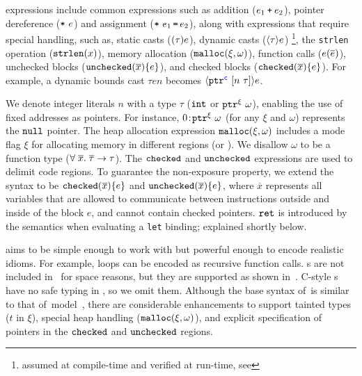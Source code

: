 \lang expressions include common expressions such as addition ($e_1 \mathbin{\texttt{+}} e_2$), 
pointer dereference ($\texttt{*}~{e}$) and assignment ($\texttt{*}~{e_1}\,\texttt{=}\, {e_2}$),
along with expressions that require special handling, such as,
 static casts ($\mathtt{(}{\tau}\mathtt{)}{e}$), dynamic casts ($\langle{\tau}\rangle{e}$) \footnote{assumed at compile-time and verified at run-time, see }, the \texttt{strlen} operation ($\mathtt{strlen}({x})$),
memory allocation ($\mathtt{malloc}({\xi},{\omega})$), 
function calls (${e}({\overline{e}})$),
unchecked blocks ($\mathtt{unchecked}({\overline{x}})\{e\}$), and checked blocks ($\mathtt{checked}({\overline{x}}){\{e\}}$).
For example, a dynamic bounds cast
  {\footnotesize
    $\tau$\code{>>(}$e$$n$\code{))} }
becomes 
{\footnotesize$\langle{\ensuremath{\mathtt{ptr}^{\textcolor{blue}{\texttt{c}}}~{[{n}~{\tau}]}}}\rangle{e}$}. 
% 

% 
We denote integer literals $n$ with a type $\tau$ (\ie $\mathtt{int}$ or $\mathtt{ptr}^{\xi}~{\omega}$), enabling the use of fixed addresses as pointers.
For instance, ${0}\!:\!{\mathtt{ptr}^{\xi}~{\omega}}$ (for any $\xi$ and $\omega$) represents the $\mathtt{null}$ pointer.
The heap allocation expression $\mathtt{malloc}({\xi},{\omega})$ includes a mode flag $\xi$ for allocating memory in different regions (\cregion or \ucregion).
We disallow $\omega$ to be a function type ($\forall \;\overline{x}.\;{\overline{\tau}}\to\tau$).
The $\mathtt{checked}$ and $\mathtt{unchecked}$ expressions are used to delimit code regions.
To guarantee the non-exposure property, we extend the \checkedc syntax to be $\mathtt{checked}({\overline{x}}){\{e\}}$ and $\mathtt{unchecked}({\overline{x}})\{e\}$,
where $\overline{x}$ represents all variables that are allowed to communicate between instructions outside and inside of the block $e$, and cannot contain checked pointers.
$\mathtt{ret}$ is introduced by the semantics when evaluating a \texttt{let} binding; explained shortly below.

% 
\lang{} aims to be simple enough to work with but powerful enough to
encode realistic \systemname idioms. For example,
loops can be encoded as recursive function calls. s are
not included in~ for space reasons, but they are
supported as shown in~\cite{li22checkedc}.
C-style s have no safe typing in \checkedc, so we omit them.
Although the base syntax of~\lang is similar to that of~\checkedc model~\cite{li22checkedc}, there are considerable enhancements to support tainted types ($t$ in $\xi$), special heap handling (\ie $\mathtt{malloc}({\xi},{\omega})$), and explicit specification of pointers in the $\mathtt{checked}$ and $\mathtt{unchecked}$ regions.

